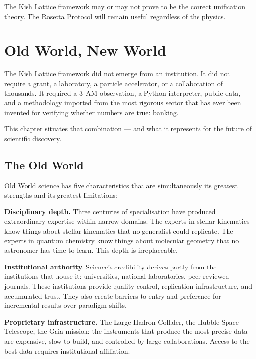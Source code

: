 \documentclass[11pt, letterpaper, openany]{book}
\begin{document}
The Kish Lattice framework may or may not prove to be the correct unification theory.
The Rosetta Protocol will remain useful regardless of the physics.

\chapter{Old World, New World}

The Kish Lattice framework did not emerge from an institution. It did not require a
grant, a laboratory, a particle accelerator, or a collaboration of thousands. It
required a 3~AM observation, a Python interpreter, public data, and a methodology
imported from the most rigorous sector that has ever been invented for verifying
whether numbers are true: banking.

This chapter situates that combination --- and what it represents for the future of
scientific discovery.

\section*{The Old World}

Old World science has five characteristics that are simultaneously its greatest
strengths and its greatest limitations:

\textbf{Disciplinary depth.} Three centuries of specialisation have produced
extraordinary expertise within narrow domains. The experts in stellar kinematics know
things about stellar kinematics that no generalist could replicate. The experts in
quantum chemistry know things about molecular geometry that no astronomer has time to
learn. This depth is irreplaceable.

\textbf{Institutional authority.} Science's credibility derives partly from the
institutions that house it: universities, national laboratories, peer-reviewed journals.
These institutions provide quality control, replication infrastructure, and accumulated
trust. They also create barriers to entry and preference for incremental results over
paradigm shifts.

\textbf{Proprietary infrastructure.} The Large Hadron Collider, the Hubble Space
Telescope, the Gaia mission: the instruments that produce the most precise data are
expensive, slow to build, and controlled by large collaborations. Access to the best
data requires institutional affiliation.
\end{document}
